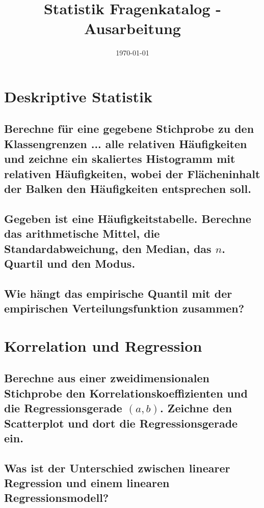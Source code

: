\documentclass[a4paper,10pt]{article}
\title{Statistik Fragenkatalog - Ausarbeitung}
\author{}
\date{\today}
\begin{document}
  \maketitle
  \newpage
  \tableofcontents{}
  \newpage
\section{Deskriptive Statistik}
\subsection{Berechne für eine gegebene Stichprobe zu den Klassengrenzen ... alle relativen Häufigkeiten und zeichne ein skaliertes Histogramm mit relativen Häufigkeiten, wobei der Flächeninhalt der Balken den Häufigkeiten entsprechen soll.}

\subsection{Gegeben ist eine Häufigkeitstabelle. Berechne das arithmetische Mittel, die Standardabweichung, den Median, das $n$. Quartil und den Modus.}

\subsection{Wie hängt das empirische Quantil mit der empirischen Verteilungsfunktion zusammen?}

\newpage
\section{Korrelation und Regression}
\subsection{Berechne aus einer zweidimensionalen Stichprobe den Korrelationskoeffizienten und die Regressionsgerade $(a, b)$. Zeichne den Scatterplot und dort die Regressionsgerade ein.}

\subsection{Was ist der Unterschied zwischen linearer Regression und einem linearen Regressionsmodell?}
\end{document}
